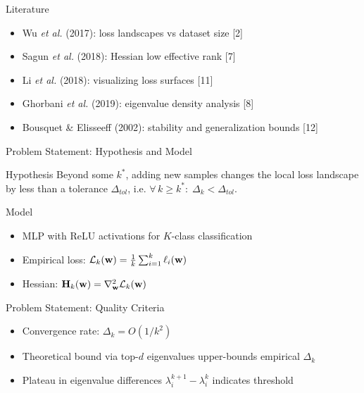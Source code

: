 \documentclass{beamer}
\begin{document}
\begin{frame}{Literature}
    \begin{itemize}
        \item Wu \textit{et al.} (2017): loss landscapes vs dataset size [2]
        \item Sagun \textit{et al.} (2018): Hessian low effective rank [7]
        \item Li \textit{et al.} (2018): visualizing loss surfaces [11]
        \item Ghorbani \textit{et al.} (2019): eigenvalue density analysis [8]
        \item Bousquet \& Elisseeff (2002): stability and generalization bounds [12]
    \end{itemize}
\end{frame}

\begin{frame}{Problem Statement: Hypothesis and Model}
    \begin{block}{Hypothesis}
        Beyond some $k^*$, adding new samples changes the local loss landscape by less than a tolerance $\Delta_{tol}$, i.e.
        $\forall\, k \ge k^* : \; \Delta_k < \Delta_{tol}$.
    \end{block}
    \begin{block}{Model}
        \begin{itemize}
            \item MLP with ReLU activations for $K$-class classification
            \item Empirical loss: $\mathcal{L}_k(\mathbf{w}) = \frac1k \sum_{i=1}^k \ell_i(\mathbf{w})$
            \item Hessian: $\mathbf{H}_k(\mathbf{w}) = \nabla^2_{\mathbf{w}} \mathcal{L}_k(\mathbf{w})$
        \end{itemize}
    \end{block}
\end{frame}

\begin{frame}{Problem Statement: Quality Criteria}
    \begin{itemize}
        \item Convergence rate: $\Delta_k = O(1/k^2)$
        \item Theoretical bound via top-$d$ eigenvalues upper-bounds empirical $\Delta_k$
        \item Plateau in eigenvalue differences $\lambda_i^{k+1}-\lambda_i^k$ indicates threshold
    \end{itemize}
\end{frame}
\end{document}
